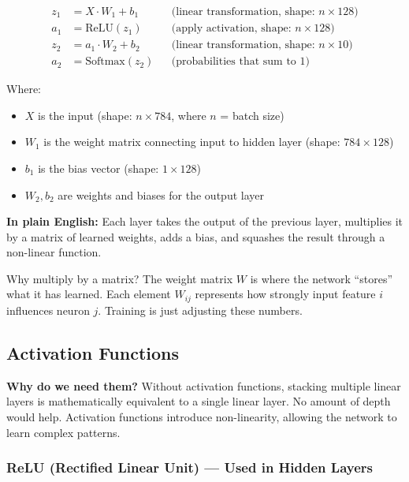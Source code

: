 \documentclass[12pt, a4paper]{article}
\begin{document}
\begin{align}
  z_1 &= X \cdot W_1 + b_1 && \text{(linear transformation, shape: } n \times 128\text{)} \\
  a_1 &= \text{ReLU}(z_1) && \text{(apply activation, shape: } n \times 128\text{)} \\
  z_2 &= a_1 \cdot W_2 + b_2 && \text{(linear transformation, shape: } n \times 10\text{)} \\
  a_2 &= \text{Softmax}(z_2) && \text{(probabilities that sum to 1)}
\end{align}

Where:
\begin{itemize}
  \item $X$ is the input (shape: $n \times 784$, where $n$ = batch size)
  \item $W_1$ is the weight matrix connecting input to hidden layer (shape: $784 \times 128$)
  \item $b_1$ is the bias vector (shape: $1 \times 128$)
  \item $W_2, b_2$ are weights and biases for the output layer
\end{itemize}

\textbf{In plain English:} Each layer takes the output of the previous layer, multiplies it by a matrix of learned weights, adds a bias, and squashes the result through a non-linear function.

\begin{conceptbox}{Why multiply by a matrix?}
The weight matrix $W$ is where the network ``stores'' what it has learned. Each element $W_{ij}$ represents how strongly input feature $i$ influences neuron $j$. Training is just adjusting these numbers.
\end{conceptbox}

\subsection{Activation Functions}

\textbf{Why do we need them?} Without activation functions, stacking multiple linear layers is mathematically equivalent to a single linear layer. No amount of depth would help. Activation functions introduce non-linearity, allowing the network to learn complex patterns.

\subsubsection{ReLU (Rectified Linear Unit) --- Used in Hidden Layers}
\end{document}
